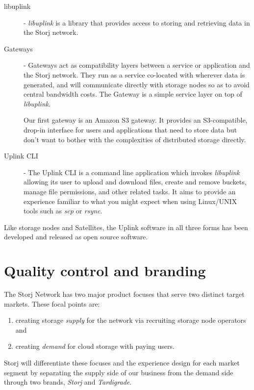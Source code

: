 \documentclass[8pt,fleqn,openany]{book}
\begin{document}
\begin{description}
\item[libuplink] - {\em libuplink} is a library that
  provides access to storing and retrieving data in the Storj network.

\item[Gateways] - Gateways act as compatibility layers between a service or
  application and the Storj network.
  They run as a service co-located with wherever data is generated, and will
  communicate directly with storage nodes so as to avoid central bandwidth
  costs.
  The Gateway is a simple service layer on top of {\em libuplink}.

  Our first gateway is an Amazon S3 gateway. It provides an S3-compatible,
  drop-in interface for users and applications that need to store data but
  don't want to bother with the complexities of distributed storage directly.

\item[Uplink CLI] - The Uplink CLI is a command line application which
  invokes {\em libuplink} allowing its user to upload and download files,
  create and remove buckets, manage file permissions, and other related tasks.
  It aims to provide an experience familiar to what you might expect when
  using Linux/UNIX tools such as {\em scp} or {\em rsync}.
\end{description}

Like storage nodes and Satellites,
the Uplink software in all three forms has been developed and released as
open source software.

\section{Quality control and branding}\label{sec:qc}

The Storj Network has two major product focuses that serve two distinct
target markets. These focal points are:

\begin{enumerate}
\item creating storage {\em supply} for the network via recruiting storage node
  operators and
\item creating {\em demand} for cloud storage with paying users.
\end{enumerate}

Storj will differentiate these focuses and the experience design
for each market segment by separating the supply side of our business from the
demand side through two brands, {\em Storj} and {\em Tardigrade}.
\end{document}
